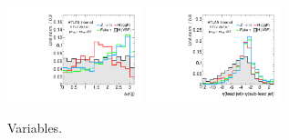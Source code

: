\begin{figure}[tp]
  \includegraphics[width=0.35\textwidth]{figures/overlaid/vbf/jets-dphi}
  \includegraphics[width=0.35\textwidth]{figures/overlaid/vbf/jets-etaprod}
  \caption{Variables.}
  \label{fig:strategy-overlaid-vbf-jets}
\end{figure}
